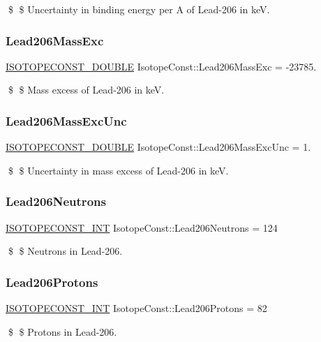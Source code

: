 \$ \$ Uncertainty in binding energy per A of Lead-\/206 in keV. \mbox{\label{group___isotope_const-_lead-_pb206_ga7bb20e10d08ac2090431c96226d4c192}} 
\subsubsection{\texorpdfstring{Lead206\+Mass\+Exc}{Lead206MassExc}}
{\footnotesize\ttfamily \mbox{\hyperlink{group___isotope_const-_macros_ga8f45a7272ce02c0b4c65c44636ed719a}{I\+S\+O\+T\+O\+P\+E\+C\+O\+N\+S\+T\+\_\+\+D\+O\+U\+B\+LE}} Isotope\+Const\+::\+Lead206\+Mass\+Exc = -\/23785.}

\$ \$ Mass excess of Lead-\/206 in keV. \mbox{\label{group___isotope_const-_lead-_pb206_ga3e34e7c184132589f813ce471f77cbf5}} 
\subsubsection{\texorpdfstring{Lead206\+Mass\+Exc\+Unc}{Lead206MassExcUnc}}
{\footnotesize\ttfamily \mbox{\hyperlink{group___isotope_const-_macros_ga8f45a7272ce02c0b4c65c44636ed719a}{I\+S\+O\+T\+O\+P\+E\+C\+O\+N\+S\+T\+\_\+\+D\+O\+U\+B\+LE}} Isotope\+Const\+::\+Lead206\+Mass\+Exc\+Unc = 1.}

\$ \$ Uncertainty in mass excess of Lead-\/206 in keV. \mbox{\label{group___isotope_const-_lead-_pb206_gad514b6a3317e7ff5aec69d36038a6d5a}} 
\subsubsection{\texorpdfstring{Lead206\+Neutrons}{Lead206Neutrons}}
{\footnotesize\ttfamily \mbox{\hyperlink{group___isotope_const-_macros_ga5f18360b3e99483a35c32d789e62621c}{I\+S\+O\+T\+O\+P\+E\+C\+O\+N\+S\+T\+\_\+\+I\+NT}} Isotope\+Const\+::\+Lead206\+Neutrons = 124}

\$ \$ Neutrons in Lead-\/206. \mbox{\label{group___isotope_const-_lead-_pb206_ga665973506b64ff9416506643525d8eab}} 
\subsubsection{\texorpdfstring{Lead206\+Protons}{Lead206Protons}}
{\footnotesize\ttfamily \mbox{\hyperlink{group___isotope_const-_macros_ga5f18360b3e99483a35c32d789e62621c}{I\+S\+O\+T\+O\+P\+E\+C\+O\+N\+S\+T\+\_\+\+I\+NT}} Isotope\+Const\+::\+Lead206\+Protons = 82}

\$ \$ Protons in Lead-\/206. 